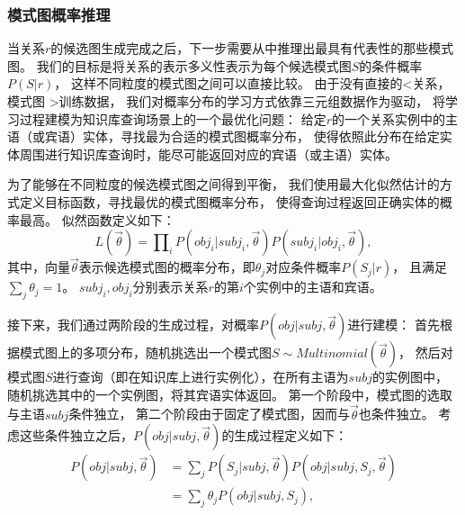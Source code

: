 
\subsubsection{模式图概率推理}
\label{sec:schema-inference}

当关系$r$的候选图生成完成之后，下一步需要从中推理出最具有代表性的那些模式图。
我们的目标是将关系的表示多义性表示为每个候选模式图$S$的条件概率$P(S|r)$，
这样不同粒度的模式图之间可以直接比较。
由于没有直接的\textless 关系，模式图 \textgreater 训练数据，
我们对概率分布的学习方式依靠三元组数据作为驱动，
将学习过程建模为知识库查询场景上的一个最优化问题：
给定$r$的一个关系实例中的主语（或宾语）实体，寻找最为合适的模式图概率分布，
使得依照此分布在给定实体周围进行知识库查询时，能尽可能返回对应的宾语（或主语）实体。


为了能够在不同粒度的候选模式图之间得到平衡，
我们使用最大化似然估计的方式定义目标函数，寻找最优的模式图概率分布，
使得查询过程返回正确实体的概率最高。
似然函数定义如下：
\begin{equation}
\label{eqn:likelihood-def}
L(\vec{\theta}) = \prod\nolimits_{i} {P(obj_i | subj_i, \vec{\theta}) P(subj_i | obj_i, \vec{\theta})},
\end{equation}
其中，向量$\vec{\theta}$表示候选模式图的概率分布，即$\theta_j$对应条件概率$P(S_j|r)$，
且满足$\sum\nolimits_{j} \theta_j = 1$。
$subj_i, obj_i$分别表示关系$r$的第$i$个实例中的主语和宾语。


接下来，我们通过两阶段的生成过程，对概率$P(obj | subj, \vec{\theta})$进行建模：
首先根据模式图上的多项分布，随机挑选出一个模式图$S \sim Multinomial(\vec{\theta})$，
然后对模式图$S$进行查询（即在知识库上进行实例化），在所有主语为$subj$的实例图中，
随机挑选其中的一个实例图，将其宾语实体返回。
第一个阶段中，模式图的选取与主语$subj$条件独立，
第二个阶段由于固定了模式图，因而与$\vec{\theta}$也条件独立。
考虑这些条件独立之后，$P(obj | subj, \vec{\theta})$的生成过程定义如下：
\begin{equation}
\label{eqn:score-def}
\begin{aligned}
P(obj | subj, \vec{\theta})	& = \sum\nolimits_{j} {P(S_j | subj, \vec{\theta}) P(obj | subj, S_j, \vec{\theta})} \\
					        & = \sum\nolimits_{j} {\theta_j P(obj | subj, S_j)},
\end{aligned}
\end{equation}


